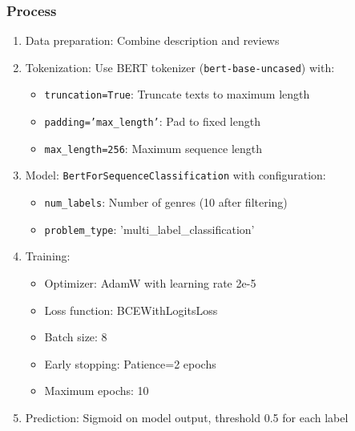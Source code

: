 \documentclass[12pt,a4paper]{article}
\begin{document}
\subsubsection{Process}
\begin{enumerate}
    \item Data preparation: Combine description and reviews
    \item Tokenization: Use BERT tokenizer (\texttt{bert-base-uncased}) with:
    \begin{itemize}
        \item \texttt{truncation=True}: Truncate texts to maximum length
        \item \texttt{padding='max\_length'}: Pad to fixed length
        \item \texttt{max\_length=256}: Maximum sequence length
    \end{itemize}
    \item Model: \texttt{BertForSequenceClassification} with configuration:
    \begin{itemize}
        \item \texttt{num\_labels}: Number of genres (10 after filtering)
        \item \texttt{problem\_type}: 'multi\_label\_classification'
    \end{itemize}
    \item Training:
    \begin{itemize}
        \item Optimizer: AdamW with learning rate 2e-5
        \item Loss function: BCEWithLogitsLoss
        \item Batch size: 8
        \item Early stopping: Patience=2 epochs
        \item Maximum epochs: 10
    \end{itemize}
    \item Prediction: Sigmoid on model output, threshold 0.5 for each label
\end{enumerate}
\end{document}
